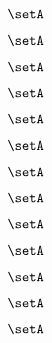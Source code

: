 \begin{forslides}
    \begin{equation}
        \label{eq:slides-processes-149}
        \setA
    \end{equation}
    
    \begin{equation}
        \label{eq:slides-processes-150}
        \setA
    \end{equation}

    \begin{equation}
        \label{eq:slides-processes-151}
        \setA
    \end{equation}

    \begin{equation}
        \label{eq:slides-processes-152}
        \setA
    \end{equation}

    \begin{equation}
        \label{eq:slides-processes-153}
        \setA
    \end{equation}

    \begin{equation}
        \label{eq:slides-processes-154}
        \setA
    \end{equation}

    \begin{equation}
        \label{eq:slides-processes-155}
        \setA
    \end{equation}

    \begin{equation}
        \label{eq:slides-processes-156}
        \setA
    \end{equation}

    \begin{equation}
        \label{eq:slides-processes-157}
        \setA
    \end{equation}

    \begin{equation}
        \label{eq:slides-processes-158}
        \setA
    \end{equation}

    \begin{equation}
        \label{eq:slides-processes-159}
        \setA
    \end{equation}
    
    \begin{equation}
        \label{eq:slides-processes-160}
        \setA
    \end{equation}

    \begin{equation}
        \label{eq:slides-processes-161}
        \setA
    \end{equation}


\end{forslides}
